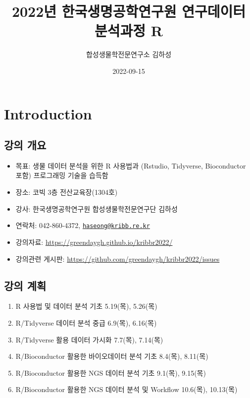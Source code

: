 \documentclass[
]{book}
\title{2022년 한국생명공학연구원 연구데이터 분석과정 R}
\author{합성생물학전문연구소 김하성}
\date{2022-09-15}
\providecommand{\tightlist}{%
  \setlength{\itemsep}{0pt}\setlength{\parskip}{0pt}}
\begin{document}
\maketitle

{
\setcounter{tocdepth}{1}
\tableofcontents
}
\hypertarget{introduction}{%
\chapter{Introduction}\label{introduction}}

\hypertarget{Information}{%
\section{강의 개요}\label{Information}}

\begin{itemize}
\tightlist
\item
  목표: 생물 데이터 분석을 위한 R 사용법과 (Rstudio, Tidyverse, Bioconductor 포함) 프로그래밍 기술을 습득함
\item
  장소: 코빅 3층 전산교육장(1304호)
\item
  강사: 한국생명공학연구원 합성생물학전문연구단 김하성
\item
  연락처: 042-860-4372, \href{mailto:haseong@kribb.re.kr}{\nolinkurl{haseong@kribb.re.kr}}
\item
  강의자료: \url{https://greendaygh.github.io/kribbr2022/}
\item
  강의관련 게시판: \url{https://github.com/greendaygh/kribbr2022/issues}
\end{itemize}

\hypertarget{Schedule}{%
\section{강의 계획}\label{Schedule}}

\begin{enumerate}
\def\labelenumi{\arabic{enumi}.}
\tightlist
\item
  R 사용법 및 데이터 분석 기초 5.19(목), 5.26(목)
\item
  R/Tidyverse 데이터 분석 중급 6.9(목), 6.16(목)
\item
  R/Tidyverse 활용 데이터 가시화 7.7(목), 7.14(목)
\item
  R/Bioconductor 활용한 바이오데이터 분석 기초 8.4(목), 8.11(목)
\item
  R/Bioconductor 활용한 NGS 데이터 분석 기초 9.1(목), 9.15(목)
\item
  R/Bioconductor 활용한 NGS 데이터 분석 및 Workflow 10.6(목), 10.13(목)
\end{enumerate}
\end{document}
